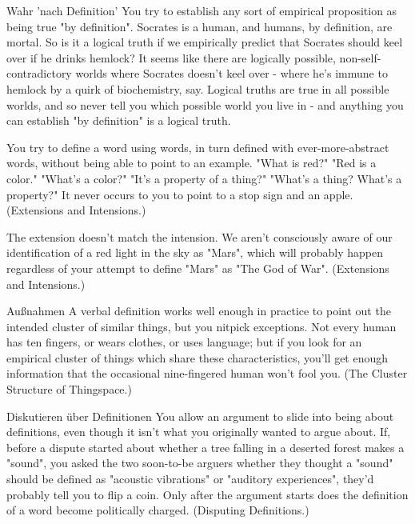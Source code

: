 
\begin{frame}[c]{Wahr 'nach Definition'}
    You try to establish any sort of empirical proposition as being true "by definition".  Socrates is a human, and humans, by definition, are mortal.  So is it a logical truth if we empirically predict that Socrates should keel over if he drinks hemlock?  It seems like there are logically possible, non-self-contradictory worlds where Socrates doesn't keel over - where he's immune to hemlock by a quirk of biochemistry, say.  Logical truths are true in all possible worlds, and so never tell you which possible world you live in - and anything you can establish "by definition" is a logical truth.
\end{frame}



\begin{frame}[c]
    You try to define a word using words, in turn defined with ever-more-abstract words, without being able to point to an example.  "What is red?"  "Red is a color."  "What's a color?"  "It's a property of a thing?"  "What's a thing?  What's a property?"  It never occurs to you to point to a stop sign and an apple.  (Extensions and Intensions.)
\end{frame}


\begin{frame}[c]
    The extension doesn't match the intension.  We aren't consciously aware of our identification of a red light in the sky as "Mars", which will probably happen regardless of your attempt to define "Mars" as "The God of War".  (Extensions and Intensions.)
\end{frame}


\begin{frame}[c]{Außnahmen}
    A verbal definition works well enough in practice to point out the intended cluster of similar things, but you nitpick exceptions. Not every human has ten fingers, or wears clothes, or uses language; but if you look for an empirical cluster of things which share these characteristics, you'll get enough information that the occasional nine-fingered human won't fool you.  (The Cluster Structure of Thingspace.)
\end{frame}


\begin{frame}[c]{Diskutieren über Definitionen}
    You allow an argument to slide into being about definitions, even though it isn't what you originally wanted to argue about. If, before a dispute started about whether a tree falling in a deserted forest makes a "sound", you asked the two soon-to-be arguers whether they thought a "sound" should be defined as "acoustic vibrations" or "auditory experiences", they'd probably tell you to flip a coin.  Only after the argument starts does the definition of a word become politically charged.  (Disputing Definitions.)
\end{frame}


